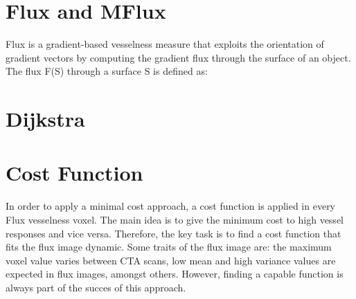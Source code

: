 \section{Flux and MFlux}

Flux is a gradient-based vesselness measure that exploits the orientation of gradient vectors by computing the gradient flux through the surface of an object. The flux F(S) through a surface S is defined as:

\section{Dijkstra}

\section{Cost Function}

In order to apply a minimal cost approach, a cost function is applied in every Flux vesselness voxel. The main idea is to give the minimum cost to high vessel responses and vice versa. Therefore, the key task is to find a cost function that fits the flux image dynamic. Some traits of the flux image are: the maximum voxel value varies between CTA scans, low mean and high variance values are expected in flux images, amongst others. However, finding a capable function is always part of the succes of this approach.

